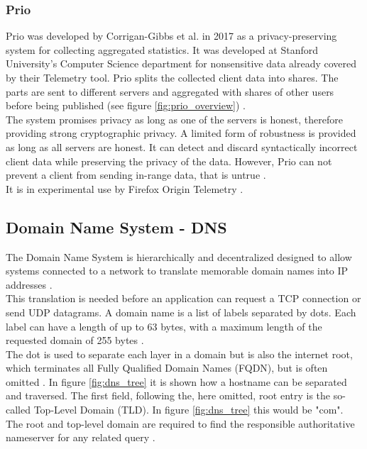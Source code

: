     \subsubsection{Prio}

        Prio was developed by Corrigan-Gibbs et al. \cite{corrigan-gibbs_prio_2017} in 2017 as a privacy-preserving system for collecting aggregated statistics.
        It was developed at Stanford University's Computer Science department for nonsensitive data already covered by their Telemetry tool. 
        Prio splits the collected client data into shares. 
        The parts are sent to different servers and aggregated with shares of other users before being published (see figure \ref{fig:prio_overview}) \cite{corrigan-gibbs_prio_2017}.\\
        The system promises privacy as long as one of the servers is honest, therefore providing strong cryptographic privacy. A limited form of robustness is provided as long as all servers are honest. It can detect and discard syntactically incorrect client data while preserving the privacy of the data. However, Prio can not prevent a client from sending in-range data, that is untrue \cite{corrigan-gibbs_prio_2017}.\\
        It is in experimental use by Firefox Origin Telemetry \cite{englehardt_next_2019}.
        
        
    \subsection{Domain Name System - DNS}
        \label{subsec:related:dns}
        The Domain Name System is hierarchically and decentralized designed to allow systems connected to a network to translate memorable domain names into IP addresses \cite{stevens_tcpip_1993}.\\

        This translation is needed before an application can request a TCP connection or send UDP datagrams. A domain name is a list of labels separated by dots. 
        Each label can have a length of up to 63 bytes, with a maximum length of the requested domain of 255 bytes \cite{stevens_tcpip_1993}.\\
        The dot is used to separate each layer in a domain but is also the internet root, which terminates all Fully Qualified Domain Names (FQDN), but is often omitted \cite{jeftovic_managing_2018}.
        In figure \ref{fig:dns_tree} it is shown how a hostname can be separated and traversed.
        The first field, following the, here omitted, root entry is the so-called Top-Level Domain (TLD). In figure \ref{fig:dns_tree} this would be "com". The root and top-level domain are required to find the responsible authoritative nameserver for any related query \cite{jeftovic_managing_2018}.

